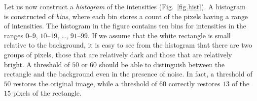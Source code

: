 \begin{figure}
\begin{minipage}{\textwidth}
\label{fig.binary-no-noise}
\label{fig.binary-noise}
\end{minipage}
\end{figure}

Let us now construct a \emph{histogram} of the intensities (Fig.~\ref{fig.hist}). A histogram is constructed of \emph{bins}, where each bin stores a count of the pixels having a range of intensities. The histogram in the figure contains ten bins for intensities in the ranges $0$--$9$, $10$--$19$, \ldots, $91$--$99$. If we assume that the white rectangle is small relative to the background, it is easy to see from the histogram that there are two groups of pixels, those that are relatively dark and those that are relatively bright. A threshold of $50$ or $60$ should be able to distinguish between the rectangle and the background even in the presence of noise. In fact, a threshold of $50$ restores the original image, while a threshold of $60$ correctly restores $13$ of the $15$ pixels of the rectangle.

